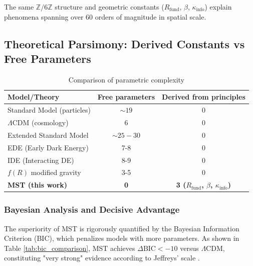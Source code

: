 \documentclass[11pt, a4paper]{article}
\theoremstyle{plain}
\theoremstyle{definition}
\newcommand{\Zmod}{\mathbb{Z}/6\mathbb{Z}}
\newcommand{\Rfactor}{R_{\text{fund}}}
\newcommand{\Kinfo}{\kappa_{\text{info}}}
\begin{document}
The same $\Zmod$ structure and geometric constants ($\Rfactor$, $\beta$, $\Kinfo$) explain phenomena spanning over 60 orders of magnitude in spatial scale.

\subsection{Theoretical Parsimony: Derived Constants vs Free Parameters}

\begin{table}[H]
\centering
\caption{Comparison of parametric complexity}
\label{tab:parsimony}
\begin{tabular}{lcc}
\toprule
\textbf{Model/Theory} & \textbf{Free parameters} & \textbf{Derived from principles} \\
\midrule
Standard Model (particles) & $\sim 19$ & 0 \\
$\Lambda$CDM (cosmology) & 6 & 0 \\
Extended Standard Model & $\sim 25-30$ & 0 \\
\addlinespace
EDE (Early Dark Energy) & 7-8 & 0 \\
IDE (Interacting DE) & 8-9 & 0 \\
$f(R)$ modified gravity & 3-5 & 0 \\
\addlinespace
\rowcolor{blue!10}
\textbf{MST (this work)} & \textbf{0} & \textbf{3 ($\Rfactor$, $\beta$, $\Kinfo$)} \\
\bottomrule
\end{tabular}
\end{table}

\subsubsection{Bayesian Analysis and Decisive Advantage}
\label{subsec:bayesian_analysis}

The superiority of MST is rigorously quantified by the Bayesian Information Criterion (BIC), which penalizes models with more parameters. As shown in Table \ref{tab:bic_comparison}, MST achieves $\Delta\text{BIC} < -10$ versus $\Lambda$CDM, constituting "very strong" evidence according to Jeffreys' scale \cite{Kass1995}.
\end{document}
